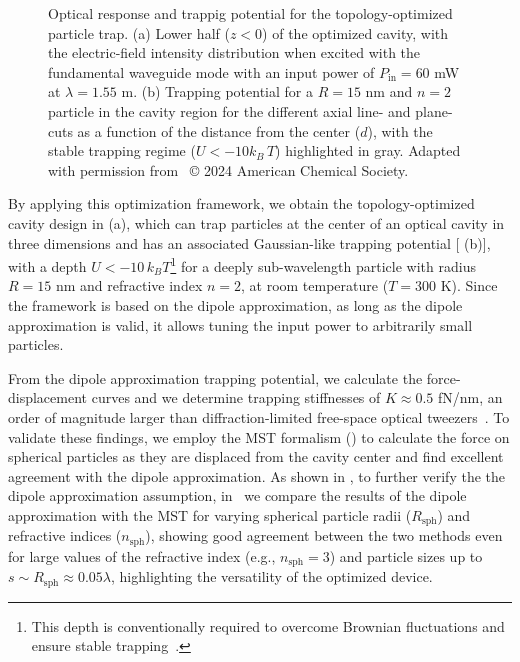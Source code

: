 \begin{figure}[tb]
    \centering
    \caption{Optical response and trappig potential for the topology-optimized particle trap. (a) Lower half ($z<0$) of the optimized cavity, with the electric-field intensity
    distribution when excited with the fundamental waveguide mode with an input power of $P_\text{in}=60$ mW at $\lambda=1.55$ \textmu m. (b) Trapping potential for a $R=15$ nm and $n=2$ particle in the cavity region for the different axial line- and plane-cuts as a function
    of the distance from the center ($d$), with the stable trapping regime ($U<-10 k_B\, T$) highlighted in gray. Adapted with permission from~\cite{ownpub1} © 2024 American Chemical Society.}
    \label{fig:MST_dipole}
\end{figure}

By applying this optimization framework, we obtain the topology-optimized cavity design in  (a), which can trap particles at the center of an optical
cavity in three dimensions and has an associated Gaussian-like trapping potential [ (b)], with a depth  $U<-10\, k_B T$\footnote{This depth is conventionally required to overcome Brownian fluctuations and ensure stable trapping~\cite{novotny}.} for a deeply sub-wavelength particle with radius $R=15$ nm and refractive index $n=2$, at room temperature ($T=300$ K).
Since the framework is based on the dipole approximation,
as long as the dipole approximation is valid, it allows tuning the input power to arbitrarily small particles.

From the dipole approximation trapping potential, we calculate the force-displacement curves and we determine trapping stiffnesses
of $K \approx 0.5$ fN/nm, an order of magnitude larger than diffraction-limited free-space optical tweezers~\cite{ownpub1}. To validate these findings,
we employ the MST formalism () to calculate the force on spherical particles as they are displaced from the cavity center and find excellent
agreement with the dipole approximation. As shown in , to further verify the the dipole approximation assumption, in~\cite{ownpub3} we compare the results of the dipole approximation with the MST
for varying spherical particle radii ($R_\text{sph}$) and refractive indices ($n_\text{sph}$), showing good agreement between the two methods
even for large values of the refractive index (e.g., $n_\text{sph}=3$) and particle sizes up to $s \sim R_\text{sph}\approx 0.05 \lambda$, highlighting the versatility of the optimized device.

